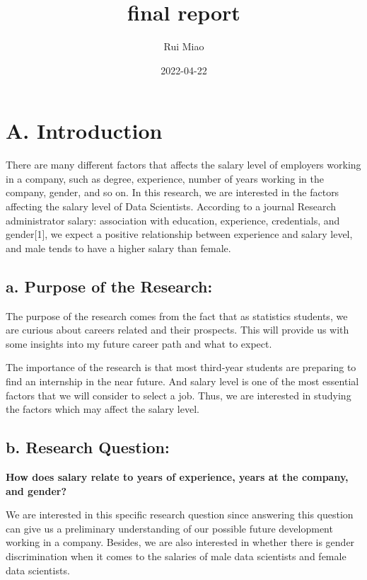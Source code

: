\documentclass[
]{article}
\title{final report}
\author{Rui Miao}
\date{2022-04-22}
\begin{document}
\maketitle

\hypertarget{a.-introduction}{%
\section{A. Introduction}\label{a.-introduction}}

There are many different factors that affects the salary level of
employers working in a company, such as degree, experience, number of
years working in the company, gender, and so on. In this research, we
are interested in the factors affecting the salary level of Data
Scientists. According to a journal Research administrator salary:
association with education, experience, credentials, and gender{[}1{]},
we expect a positive relationship between experience and salary level,
and male tends to have a higher salary than female.

\hypertarget{a.-purpose-of-the-research}{%
\subsection{a. Purpose of the
Research:}\label{a.-purpose-of-the-research}}

The purpose of the research comes from the fact that as statistics
students, we are curious about careers related and their prospects. This
will provide us with some insights into my future career path and what
to expect.

The importance of the research is that most third-year students are
preparing to find an internship in the near future. And salary level is
one of the most essential factors that we will consider to select a job.
Thus, we are interested in studying the factors which may affect the
salary level.

\hypertarget{b.-research-question}{%
\subsection{b. Research Question:}\label{b.-research-question}}

\textbf{How does salary relate to years of experience, years at the
company, and gender?}

We are interested in this specific research question since answering
this question can give us a preliminary understanding of our possible
future development working in a company. Besides, we are also interested
in whether there is gender discrimination when it comes to the salaries
of male data scientists and female data scientists.
\end{document}
